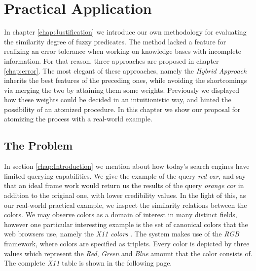 \documentclass[egilmezThesis.tex]{subfiles}
\begin{document}
\chapter{Practical Application}
\label{chap:example}

In chapter \ref{chap:Justification} we introduce our own methodology for evaluating the similarity degree of fuzzy predicates. The method lacked a feature for realizing an error tolerance when working on knowledge bases with incomplete information. For that reason, three approaches are proposed in chapter \ref{chap:error}. The most elegant of these approaches, namely the \textit{Hybrid Approach} inherits the best features of the preceding ones, while avoiding the shortcomings via merging the two by attaining them some weights. Previously we displayed how these weights could be decided in an intuitionistic way, and hinted the possibility of an atomized procedure. In this chapter we show our proposal for atomizing the process with a real-world example.

\section{The Problem}
\label{problem}
In section \ref{chap:Introduction} we mention about how today's search engines have limited querying capabilities. We give the example of the query \textit{red car}, and say that an ideal frame work would return us the results of the query \textit{orange car} in addition to the original one, with lower credibility values. In the light of this, as our real-world practical example, we inspect the similarity relations between the colors. We may observe colors as a domain of interest in many distinct fields, however one particular interesting example is the set of canonical colors that the web browsers use, namely the \textit{X11 colors} \cite{Wri08}. The system makes use of the \textit{RGB} framework, where colors are specified as triplets. Every color is depicted by three values which represent the \textit{Red}, \textit{Green} and \textit{Blue} amount that the color consists of. The complete \textit{X11} table is shown in the following page.
\end{document}
